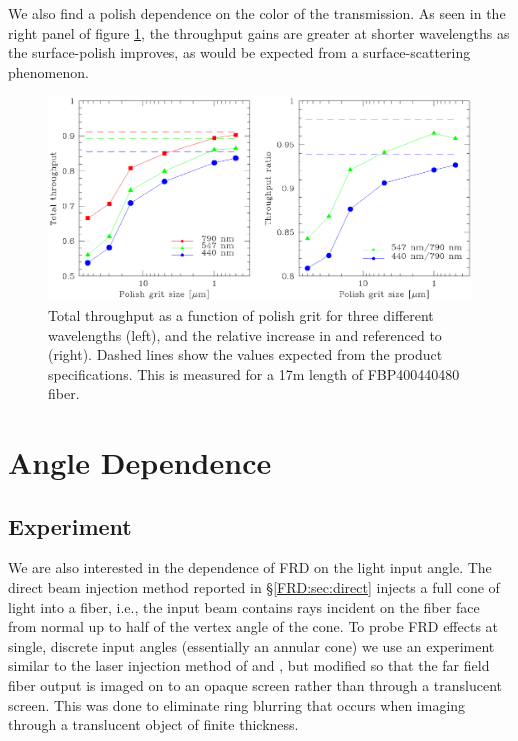 We also find a polish dependence on the color of the transmission.  As
seen in the right panel of figure \ref{fig:tputwave}, the throughput
gains are greater at shorter wavelengths as the surface-polish
improves, as would be expected from a surface-scattering phenomenon.

\begin{figure}[ht]
  \centering
  \includegraphics[width=\textwidth, trim=0 4in 0 0, clip=true]{FRD/figs/tput.eps}
  \caption[Total throughput as a function of wavelength and polish
    level]{\fixspacing\label{fig:tputwave} Total throughput as a function of
    polish grit for three different wavelengths (left), and the relative
    increase in \filtB and \filty referenced to \filtI (right). Dashed lines
    show the values expected from the product specifications. This is measured
    for a 17m length of FBP400440480 fiber.}
\end{figure}

\section{Angle Dependence}
\label{FRD:sec:angle}
\subsection{Experiment}
We are also interested in the dependence of FRD on the light input
angle. The direct beam injection method reported in
\S\ref{FRD:sec:direct} injects a full cone of light into a fiber,
i.e., the input beam contains rays incident on the fiber face from
normal up to half of the vertex angle of the cone.  To probe FRD
effects at single, discrete input angles (essentially an annular cone)
we use an experiment similar to the laser injection method of
\citet{Carrasco} and \citet{Haynes11}, but modified so that the far field fiber
output is imaged on to an opaque screen rather than through a
translucent screen. This was done to eliminate ring blurring that
occurs when imaging through a translucent object of finite thickness.

